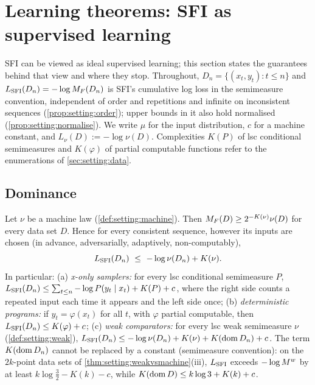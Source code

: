 \section{Learning theorems: SFI as supervised learning}\label{sec:learn}

SFI can be viewed as ideal supervised learning; this section states the guarantees behind that view and where they stop. Throughout, $D_n=\{(x_t,y_t):t\le n\}$ and $L_{\mathrm{SFI}}(D_n)=-\log M_{F}(D_n)$ is SFI's cumulative log loss in the semimeasure convention, independent of order and repetitions and infinite on inconsistent sequences (\cref{prop:setting:order}); upper bounds in it also hold normalised (\cref{prop:setting:normalise}). We write $\mu$ for the input distribution, $c$ for a machine constant, and $L_\nu(D):=-\log\nu(D)$. Complexities $K(P)$ of lsc conditional semimeasures and $K(\varphi)$ of partial computable functions refer to the enumerations of \cref{sec:setting:data}.

\subsection{Dominance}\label{sec:learn:dominance}

\begin{theorem}[dominance]\label{thm:learn:dominance}
Let $\nu$ be a machine law (\cref{def:setting:machine}). Then $M_{F}(D)\ge2^{-K(\nu)}\nu(D)$ for every data set $D$. Hence for every consistent sequence, however its inputs are chosen (in advance, adversarially, adaptively, non-computably),
\begin{equation}\label{eq:learn:dominance}
L_{\mathrm{SFI}}(D_n)\ \le\ -\log\nu(D_n)+K(\nu).
\end{equation}
In particular:
(a) \emph{x-only samplers:} for every lsc conditional semimeasure $P$, $L_{\mathrm{SFI}}(D_n)\le\sum_{t\le n}-\log P(y_t\mid x_t)+K(P)+c$, where the right side counts a repeated input each time it appears and the left side once;
(b) \emph{deterministic programs:} if $y_t=\varphi(x_t)$ for all $t$, with $\varphi$ partial computable, then $L_{\mathrm{SFI}}(D_n)\le K(\varphi)+c$;
(c) \emph{weak comparators:} for every lsc weak semimeasure $\nu$ (\cref{def:setting:weak}), $L_{\mathrm{SFI}}(D_n)\le-\log\nu(D_n)+K(\nu)+K(\operatorname{dom} D_n)+c$. The term $K(\operatorname{dom} D_n)$ cannot be replaced by a constant (semimeasure convention): on the $2k$-point data sets of \cref{thm:setting:weakvsmachine}(iii), $L_{\mathrm{SFI}}$ exceeds $-\log M^{w}$ by at least $k\log\frac32-K(k)-c$, while $K(\operatorname{dom} D)\le k\log3+K(k)+c$.
\end{theorem}

